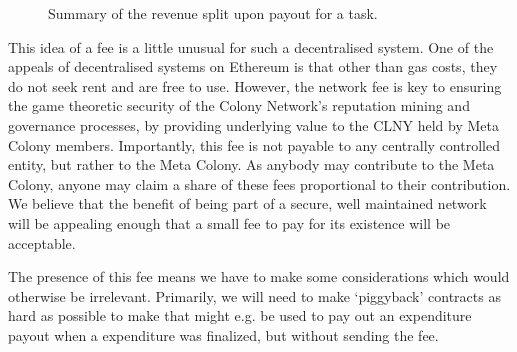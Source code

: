 \begin{figure}[htp]
\centering
 \caption{Summary of the revenue split upon payout for a task.}
 \label{fig:revenueSplit}

\end{figure}

This idea of a fee is a little unusual for such a decentralised system. One of the appeals of decentralised systems on Ethereum is that other than gas costs, they do not seek rent and are free to use. However, the network fee is key to ensuring the game theoretic security of the Colony Network's reputation mining and governance processes, by providing underlying value to the CLNY held by Meta Colony members. Importantly, this fee is not payable to any centrally controlled entity, but rather to the Meta Colony. As anybody may contribute to the Meta Colony, anyone may claim a share of these fees proportional to their contribution. We believe that the benefit of being part of a secure, well maintained network will be appealing enough that a small fee to pay for its existence will be acceptable.

The presence of this fee means we have to make some considerations which would otherwise be irrelevant. Primarily, we will need to make `piggyback' contracts as hard as possible to make that might e.g. be used to pay out an expenditure payout when a expenditure was finalized, but without sending the fee.

